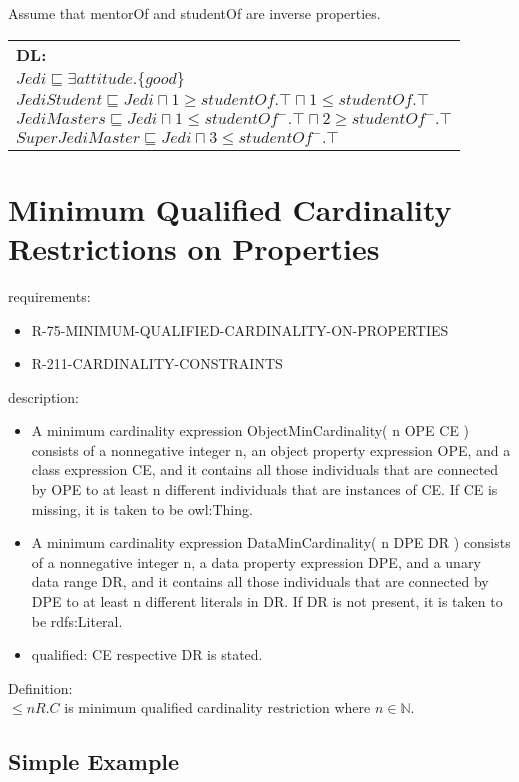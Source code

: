 \documentclass{llncs}
\newenvironment{DL}{
  \scriptsize
  \sffamily
  \vspace{0.3cm}
  \begin{tabular}{l}
	\textbf{DL:} \\

}{
  \end{tabular}
  \linebreak
}
\begin{document}
Assume that  mentorOf and studentOf are inverse properties.\\
\begin{DL}
$Jedi \sqsubseteq \exists attitude.\{good\} $\\
$JediStudent \sqsubseteq Jedi \sqcap 1\geq studentOf.\top \sqcap 1\leq studentOf.\top$ \\
$JediMasters \sqsubseteq Jedi \sqcap 1\leq studentOf^{-}.\top \sqcap 2\geq studentOf^{-}.\top $\\
$SuperJediMaster \sqsubseteq Jedi \sqcap  3\leq studentOf^{-}.\top $
\end{DL}

\section{Minimum Qualified Cardinality Restrictions on Properties}

requirements:

\begin{itemize}
	\item R-75-MINIMUM-QUALIFIED-CARDINALITY-ON-PROPERTIES
  \item R-211-CARDINALITY-CONSTRAINTS
\end{itemize}

description:

\begin{itemize}
	\item A minimum cardinality expression ObjectMinCardinality( n OPE CE ) consists of a nonnegative integer n, an object property expression OPE, and a class expression CE, and it contains all those individuals that are connected by OPE to at least n different individuals that are instances of CE. If CE is missing, it is taken to be owl:Thing.
	\item A minimum cardinality expression DataMinCardinality( n DPE DR ) consists of a nonnegative integer n, a data property expression DPE, and a unary data range DR, and it contains all those individuals that are connected by DPE to at least n different literals in DR. If DR is not present, it is taken to be rdfs:Literal. 
	\item qualified: CE respective DR is stated.
\end{itemize}
Definition:\\

$\leq n R. C$ is minimum qualified cardinality restriction where $n \in \mathbb{N}$.

\subsection{Simple Example}
\end{document}
